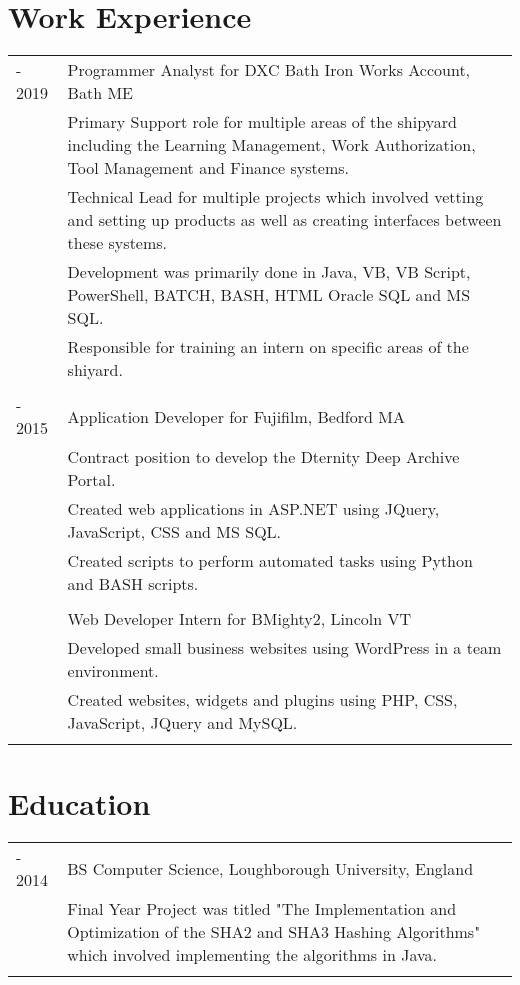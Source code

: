 \documentclass[12pt]{article}
\begin{document}
\section*{\selectfont Work Experience}
\begin{tabular}{p{2.3cm}|p{15.4cm}}
	\centering 2015 - 2019 & Programmer Analyst for DXC Bath Iron Works Account, Bath ME\\&\small{Primary Support role for multiple areas of the shipyard including the Learning Management, Work Authorization, Tool Management and Finance systems.}\\&\small{Technical Lead for multiple projects which involved vetting and setting up products as well as creating interfaces between these systems.}\\&\small{Development was primarily done in Java, VB, VB Script, PowerShell, BATCH, BASH, HTML Oracle SQL and MS SQL.}\\&\small{Responsible for training an intern on specific areas of the shiyard.}
	\\\multicolumn{2}{c}{} \\
	\centering 2014 - 2015 & Application Developer for Fujifilm, Bedford MA\\&\small{Contract position to develop the Dternity Deep Archive Portal.}\\&\small{Created web applications in ASP.NET using JQuery, JavaScript, CSS and MS SQL.}\\&\small{Created scripts to perform automated tasks using Python and BASH scripts.}
	\\\multicolumn{2}{c}{} \\
	\centering 2013 & Web Developer Intern for BMighty2, Lincoln VT\\&\small{Developed small business websites using WordPress in a team environment.}\\&\small{Created websites, widgets and plugins using PHP, CSS, JavaScript, JQuery and MySQL.}\\\multicolumn{2}{c}{} \\
\end{tabular}

\section*{\selectfont Education}
\begin{tabular}{p{2.3cm}|p{15.4cm}}
	\centering 2011 - 2014 & BS Computer Science, Loughborough University, England\\&\small{Final Year Project was titled "The Implementation and Optimization of the SHA2 and SHA3 Hashing Algorithms" which involved implementing the algorithms in Java.}\\\multicolumn{2}{c}{} \\
\end{tabular}
\end{document}
